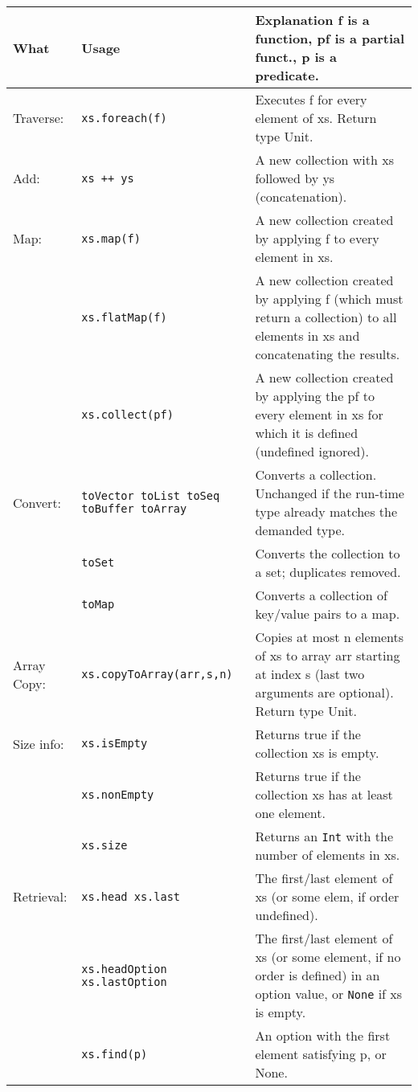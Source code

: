 \documentclass[article, a5paper]{memoir}
\newcommand{\LangColor}{scalared}
\newcommand{\head}[1]{{\bfseries {\color{\LangColor}{#1}}\par\vspace{1mm}\hrule\vspace{-2mm}}}
\renewcommand{\arraystretch}{0.9}
\newcommand{\Newline}{\vspace{\baselineskip}}
\begin{document}
\vspace*{-2.0em}\head{\texttt{Iterable[A]}}\Newline
{\small\renewcommand{\arraystretch}{1.14}
\begin{tabular}{@{}l p{3.6cm} p{6.8cm}}
\textbf{What} & \textbf{Usage} & \textbf{Explanation} f is a function, pf is a partial funct., p is a predicate.\\ \hline
Traverse: & \texttt{xs.foreach(f)} & Executes f for every element of xs. Return type Unit.\\ \cline{1-3}

  Add: & \texttt{xs ++ ys} & A new collection with xs followed by ys (concatenation).\\\cline{1-3}

  Map:     
      & \texttt{xs.map(f)} & A new collection created by applying f to every element in xs.\\ \cline{2-3}
      & \texttt{xs.flatMap(f)} & A new collection created by applying f (which must return a collection) to all elements in xs and concatenating the results.\\ \cline{2-3}
       & \texttt{xs.collect(pf)} & A new collection created by applying the pf to every element in xs for which it is defined (undefined ignored).\\ \cline{1-3}

  Convert: & \texttt{toVector toList toSeq toBuffer toArray} & Converts a collection. Unchanged if the run-time type already matches the demanded type.\\ \cline{2-3}
   & \texttt{toSet} & Converts the collection to a set; duplicates removed.\\ \cline{2-3}
   & \texttt{toMap} & Converts a collection of key/value pairs to a map. \\ \cline{1-3}

   Array Copy:  & \texttt{xs.copyToArray(arr,s,n)} & Copies at most n elements of xs to array arr starting at index s (last two arguments are optional). Return type Unit.\\ \cline{1-3}

  Size info: & \texttt{xs.isEmpty} & Returns true if the collection xs is empty.\\ \cline{2-3}
   & \texttt{xs.nonEmpty} & Returns true if the collection xs has at least one element.\\ \cline{2-3}
   & \texttt{xs.size} & Returns an \texttt{Int} with the number of elements in xs.\\ \cline{1-3}
  Retrieval: & \texttt{xs.head xs.last} &  	The first/last element of xs (or some elem, if order undefined).\\ \cline{2-3}
      & \texttt{xs.headOption \newline xs.lastOption} & The first/last element of xs (or some element, if no order is defined) in an option value, or \texttt{None} if xs is empty.\\ \cline{2-3}
      & \texttt{xs.find(p)} & An option with the first element satisfying p, or None.\\ \cline{1-3}



\end{tabular}}
\end{document}
